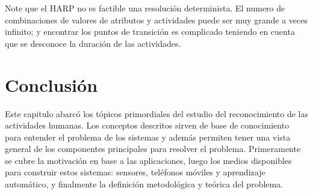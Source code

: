 Note que el HARP no es factible una resolución determinista. El numero
de combinaciones de valores de atributos y actividades puede ser muy
grande a veces infinito; y encontrar los puntos de transición es complicado
teniendo en cuenta que se desconoce la duración de las actividades.

\section{Conclusión}

\label{sec27:conclusion}Este capitulo abarcó los tópicos primordiales
del estudio del reconocimiento de las actividades humanas. Los conceptos
descritos sirven de base de conocimiento para entender el problema
de los sistemas  y además permiten tener una vista general
de los componentes principales para resolver el problema. Primeramente
se cubre la motivación en base a las aplicaciones, luego los medios
disponibles para construir estos sistemas: sensores, teléfonos móviles
y aprendizaje automático, y finalmente la definición metodológica
y teórica del problema. 
